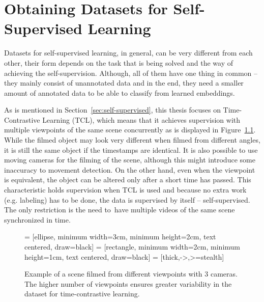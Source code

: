 \chapter{\label{chap:dataset}Obtaining Datasets for Self-Supervised Learning}

Datasets for self-supervised learning, in general, can be very different from each other, their form depends on the task that is being solved and the way of achieving the self-supervision. Although, all of them have one thing in common -- they mainly consist of unannotated data and in the end, they need a smaller amount of annotated data to be able to classify from learned embeddings.

As is mentioned in Section~\ref{sec:self-supervised}, this thesis focuses on Time-Contrastive Learning (TCL), which means that it achieves supervision with multiple viewpoints of the same scene concurrently as is displayed in Figure~\ref{fig:scene-multiple-cameras}. While the filmed object may look very different when filmed from different angles, it is still the same object if the timestamps are identical. It is also possible to use moving cameras for the filming of the scene, although this might introduce some inaccuracy to movement detection. On the other hand, even when the viewpoint is equivalent, the object can be altered only after a short time has passed. This characteristic holds supervision when TCL is used and because no extra work (e.g. labeling) has to be done, the data is supervised by itself -- self-supervised. The only restriction is the need to~have multiple videos of the same scene synchronized in time.

\begin{figure}[ht!]
    \centering

     = [ellipse, minimum width=3cm, minimum height=2cm, text centered, draw=black]
     = [rectangle, minimum width=2cm, minimum height=1cm, text centered, draw=black]
     = [thick,->,>=stealth]

    
    \caption{Example of a scene filmed from different viewpoints with 3 cameras. The higher number of viewpoints ensures greater variability in the dataset for time-contrastive learning.}
    \label{fig:scene-multiple-cameras}
\end{figure}


